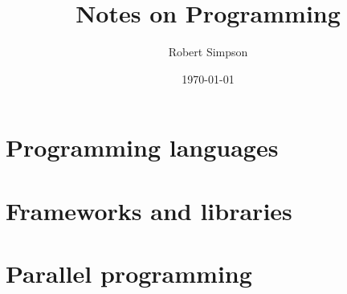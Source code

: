\documentclass[a4paper, 10pt]{report}
\title{Notes on Programming}
\author{Robert Simpson}
\date{\today}
\begin{document}
\maketitle

\part{Programming languages}






\part{Frameworks and libraries}



\part{Parallel programming}


\appendix

\end{document}
